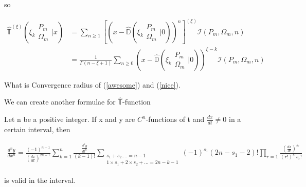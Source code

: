 so 

\begin{align}
        \hat{\mathbb{T}}^{(\xi)}\left( \xi_k \begin{matrix} P_m \\ 
        \Omega_m \end{matrix} \bigg| x  \right) &= \sum_{n \geq 1} \left[\left( 
        x - \hat{\mathbb{D}}\left( \xi_k \begin{matrix} P_m \\ \Omega_m \end{matrix}
        \bigg| 0 \right)\right)^n\right]^{(\xi)} \mathcal{I}(P_m, \Omega_m, n) \\
        &= \frac{1}{\Gamma(n-\xi+1)}\sum_{n \geq 0}\left(x- \hat{\mathbb{D}}\left( 
        \xi_k \begin{matrix} P_m \\ \Omega_m \end{matrix} \bigg| 0 \right)\right)^{\xi-k}
        \mathcal{I}(P_m, \Omega_m, n)
        \label{nice}
\end{align}

\begin{question}
        What is Convergence radius of (\ref{awesome}) and (\ref{nice}).
\end{question}

We can create another formulae for \(\hat{\mathbb{T}}\)-function

\begin{theorem}
        Let n be a positive integer. If x and y are \(C^n\)-functions 
        of t and \(\frac{dx}{dt}\neq 0\) in a certain interval, then
        
        \begin{align}
                \frac{d^n y}{dx^n} = \frac{(-1)^{n-1}}{(\frac{dx}{dt})^{2n-1}}
                \sum_{k=1}^n \frac{\frac{d^ky}{dt^k}}{(k-1)!}\sum_{\substack{s_1
                + s_2 . ... = n-1 \\ 1\times s_1 + 2 \times s_2 + ... = 2n-k-1}}
                (-1)^{s_1}(2n-s_1-2)! \prod_{r=1}\frac{(\frac{dx}{dt})^{s_r}}{(r!)^{s_r}s_r!}
        \end{align}
        
        is valid in the interval. \cite{34}
        
\end{theorem}

